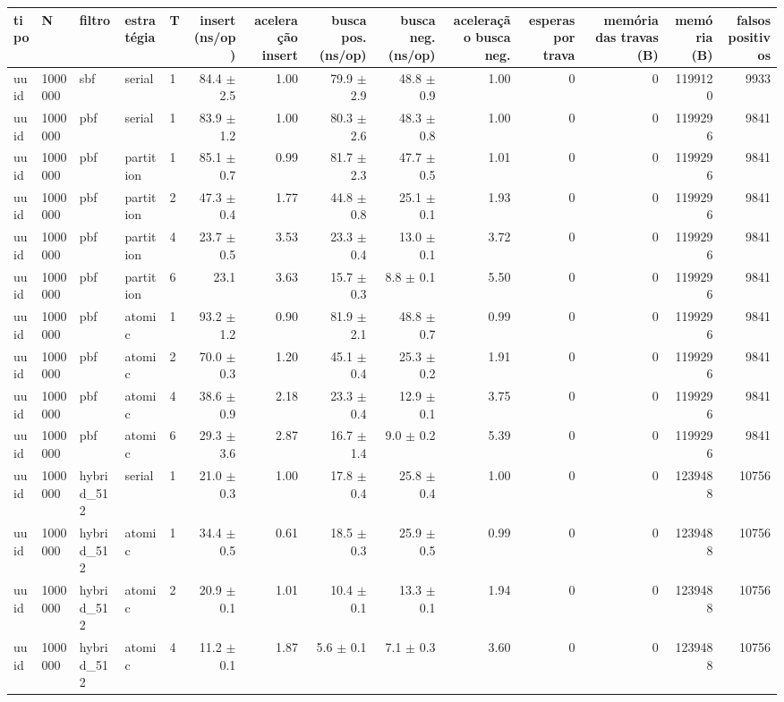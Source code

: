 \begin{tabular}{lllllrrrrrrrrr}
\toprule
tipo & N & filtro & estratégia & T & insert (ns/op) & aceleração insert & busca pos. (ns/op) & busca neg. (ns/op) & aceleração busca neg. & esperas por trava & memória das travas (B) & memória (B) & falsos positivos \\
\midrule
uuid & 1000000 & sbf & serial & 1 & 84.4 $\pm$ 2.5 & 1.00 & 79.9 $\pm$ 2.9 & 48.8 $\pm$ 0.9 & 1.00 & 0 & 0 & 1199120 & 9933 \\
uuid & 1000000 & pbf & serial & 1 & 83.9 $\pm$ 1.2 & 1.00 & 80.3 $\pm$ 2.6 & 48.3 $\pm$ 0.8 & 1.00 & 0 & 0 & 1199296 & 9841 \\
uuid & 1000000 & pbf & partition & 1 & 85.1 $\pm$ 0.7 & 0.99 & 81.7 $\pm$ 2.3 & 47.7 $\pm$ 0.5 & 1.01 & 0 & 0 & 1199296 & 9841 \\
uuid & 1000000 & pbf & partition & 2 & 47.3 $\pm$ 0.4 & 1.77 & 44.8 $\pm$ 0.8 & 25.1 $\pm$ 0.1 & 1.93 & 0 & 0 & 1199296 & 9841 \\
uuid & 1000000 & pbf & partition & 4 & 23.7 $\pm$ 0.5 & 3.53 & 23.3 $\pm$ 0.4 & 13.0 $\pm$ 0.1 & 3.72 & 0 & 0 & 1199296 & 9841 \\
uuid & 1000000 & pbf & partition & 6 & 23.1 & 3.63 & 15.7 $\pm$ 0.3 & 8.8 $\pm$ 0.1 & 5.50 & 0 & 0 & 1199296 & 9841 \\
uuid & 1000000 & pbf & atomic & 1 & 93.2 $\pm$ 1.2 & 0.90 & 81.9 $\pm$ 2.1 & 48.8 $\pm$ 0.7 & 0.99 & 0 & 0 & 1199296 & 9841 \\
uuid & 1000000 & pbf & atomic & 2 & 70.0 $\pm$ 0.3 & 1.20 & 45.1 $\pm$ 0.4 & 25.3 $\pm$ 0.2 & 1.91 & 0 & 0 & 1199296 & 9841 \\
uuid & 1000000 & pbf & atomic & 4 & 38.6 $\pm$ 0.9 & 2.18 & 23.3 $\pm$ 0.4 & 12.9 $\pm$ 0.1 & 3.75 & 0 & 0 & 1199296 & 9841 \\
uuid & 1000000 & pbf & atomic & 6 & 29.3 $\pm$ 3.6 & 2.87 & 16.7 $\pm$ 1.4 & 9.0 $\pm$ 0.2 & 5.39 & 0 & 0 & 1199296 & 9841 \\
uuid & 1000000 & hybrid\_512 & serial & 1 & 21.0 $\pm$ 0.3 & 1.00 & 17.8 $\pm$ 0.4 & 25.8 $\pm$ 0.4 & 1.00 & 0 & 0 & 1239488 & 10756 \\
uuid & 1000000 & hybrid\_512 & atomic & 1 & 34.4 $\pm$ 0.5 & 0.61 & 18.5 $\pm$ 0.3 & 25.9 $\pm$ 0.5 & 0.99 & 0 & 0 & 1239488 & 10756 \\
uuid & 1000000 & hybrid\_512 & atomic & 2 & 20.9 $\pm$ 0.1 & 1.01 & 10.4 $\pm$ 0.1 & 13.3 $\pm$ 0.1 & 1.94 & 0 & 0 & 1239488 & 10756 \\
uuid & 1000000 & hybrid\_512 & atomic & 4 & 11.2 $\pm$ 0.1 & 1.87 & 5.6 $\pm$ 0.1 & 7.1 $\pm$ 0.3 & 3.60 & 0 & 0 & 1239488 & 10756 \\

\end{tabular}
